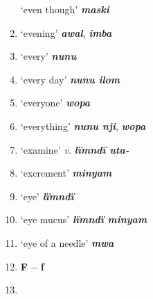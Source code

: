 \begin{enumerate}[noitemsep, label={}, align=left, widest=190, labelsep=1ex,leftmargin=*,itemindent=-10pt]
‘even though’ \textbf{\textit{maski}} \item
‘evening’ \textbf{\textit{awal}}, \textbf{\textit{imba}} \item
‘every’ \textbf{\textit{nunu}} \item
‘every day’ \textbf{\textit{nunu ilom}} \item
‘everyone’ \textbf{\textit{wopa}} \item
‘everything’ \textbf{\textit{nunu nji}}, \textbf{\textit{wopa}} \item
‘examine’ \textit{v.} \textbf{\textit{lïmndï uta-}} \item
‘excrement’ \textbf{\textit{minyam}} \item
‘eye’ \textbf{\textit{lïmndï}} \item
‘eye mucus’ \textbf{\textit{lïmndï minyam}} \item
‘eye of a needle’ \textbf{\textit{mwa}}\\ \item

\noindent \textbf{F – f}\\ \item


\end{enumerate}
